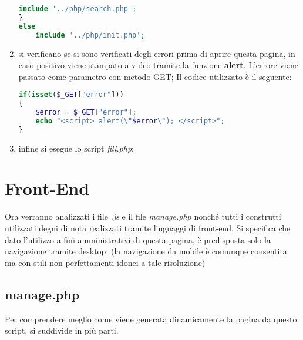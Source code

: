 \begin{enumerate}
\begin{lstlisting}[language=PHP]
	include '../php/search.php';
}
else
	include '../php/init.php';
\end{lstlisting}
\item si verificano se si sono verificati degli errori prima di aprire questa pagina, in caso positivo viene stampato a video tramite la funzione \textbf{alert}. L'errore viene passato come parametro con metodo GET;
Il codice utilizzato è il seguente:
\begin{lstlisting}[language=PHP]
if(isset($_GET["error"]))
{
	$error = $_GET["error"];
	echo "<script> alert(\"$error\"); </script>";
}
\end{lstlisting}
\item infine si esegue lo script \textit{fill.php};
\end{enumerate}

\section{Front-End}
Ora verranno analizzati i file \textit{.js} e il file \textit{manage.php} nonché tutti i construtti utilizzati degni di nota realizzati tramite linguaggi di front-end. 
Si specifica che dato l'utilizzo a fini amministrativi di questa pagina, è predisposta solo la navigazione tramite desktop. (la navigazione da mobile è comunque consentita ma con stili non perfettamenti idonei a tale risoluzione)
\subsection{manage.php}
Per comprendere meglio come viene generata dinamicamente la pagina da questo script, si suddivide in più parti.
